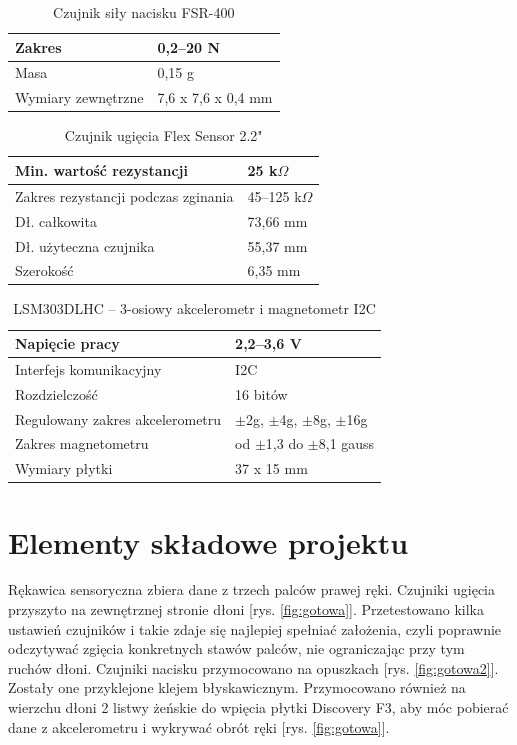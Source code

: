 \documentclass[12pt,a4paper]{article}
\begin{document}
\begin{table}[!htb]
\centering
\begin{tabularx}
{\textwidth}{ |X|X| }
\hline
Zakres & 0,2--20 N \\
\hline
Masa & 0,15 g \\ 
\hline
Wymiary zewnętrzne & 7,6 x 7,6 x 0,4 mm \\
\hline
\end{tabularx}
\caption{Czujnik siły nacisku FSR-400}
\end{table}


\begin{table}[!htb]
\centering
\begin{tabularx}
{\textwidth}{ |X|X| }
\hline
Min. wartość rezystancji & 25 k$\Omega$ \\
\hline
Zakres rezystancji podczas zginania & 45--125 k$\Omega$ \\
\hline
Dł. całkowita & 73,66 mm \\
\hline
Dł. użyteczna czujnika & 55,37 mm \\ 
\hline
Szerokość & 6,35 mm \\
\hline
\end{tabularx}
\caption{Czujnik ugięcia Flex Sensor 2.2"}
\end{table}


\begin{table}[!htb]
\centering
\begin{tabularx}
{\textwidth}{ |X|X| }
\hline
Napięcie pracy & 2,2--3,6 V \\
\hline
Interfejs komunikacyjny & I2C \\
\hline
Rozdzielczość & 16 bitów \\
\hline
Regulowany zakres akcelerometru &  $\pm$2g, $\pm$4g, $\pm$8g, $\pm$16g \\ 
\hline
Zakres magnetometru &  od $\pm$1,3 do $\pm$8,1 gauss \\ 
\hline
Wymiary płytki & 37 x 15 mm \\
\hline
\end{tabularx}
\caption{LSM303DLHC -- 3-osiowy akcelerometr i magnetometr I2C}
\end{table}

\section{Elementy składowe projektu}
Rękawica sensoryczna zbiera dane z trzech palców prawej ręki. Czujniki ugięcia przyszyto na zewnętrznej stronie dłoni [rys. \ref{fig:gotowa}].
 Przetestowano kilka ustawień czujników i takie zdaje się najlepiej spełniać założenia, czyli poprawnie odczytywać zgięcia konkretnych stawów palców, nie ograniczając przy tym ruchów dłoni. Czujniki nacisku przymocowano na opuszkach [rys. \ref{fig:gotowa2}]. Zostały one przyklejone klejem błyskawicznym. Przymocowano również na wierzchu dłoni 2 listwy żeńskie do wpięcia płytki Discovery F3, aby móc pobierać dane z akcelerometru i wykrywać obrót ręki [rys. \ref{fig:gotowa}].
 
\end{document}
